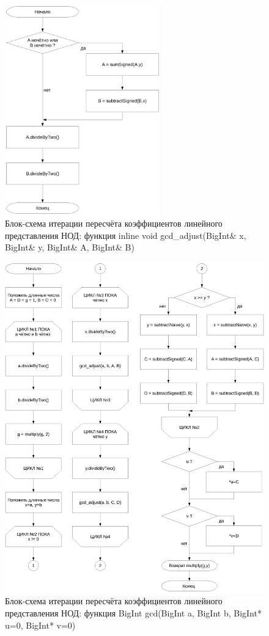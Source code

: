 \documentclass[a4paper,12pt]{article} %
\begin{document}
\begin{figure}[ht]
	\includegraphics[width=0.6\textwidth]{lr4_gcd_adjust.pdf}
	\caption{
		Блок-схема итерации пересчёта коэффициентов линейного представления НОД:
		функция inline void gcd\_adjust(BigInt\& x, BigInt\& y, BigInt\& A, BigInt\& B)
	}
	\label{bs_gcd_adjust}
\end{figure}

\begin{figure}[ht]
	\includegraphics[width=\textwidth]{lr4_gcd.pdf}
	\caption{
		Блок-схема итерации пересчёта коэффициентов линейного представления НОД:
		функция BigInt gcd(BigInt a, BigInt b, BigInt* u=0, BigInt* v=0)
	}
	\label{bs_gcd}
\end{figure}
\end{document}
